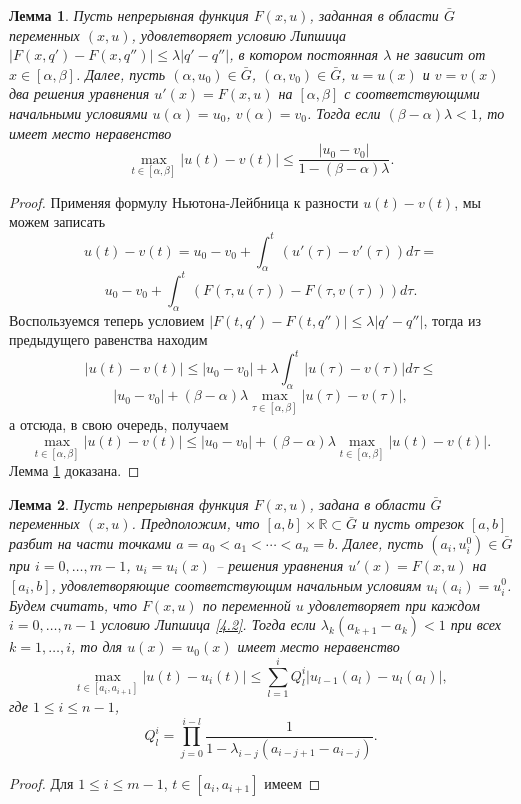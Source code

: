 \documentclass{article}
\numberwithin{equation}{section}
\theoremstyle{plain}
\newtheorem{lemma}{Лемма}[section]
\theoremstyle{definition}
\newtheorem{proof}{Доказательство}\def\theproof{}
\begin{document}
\begin{fulltext}
\begin{lemma}\label{lem4.1} Пусть непрерывная функция  $F(x,u)$, заданная в области $\bar  G$ переменных $(x,u)$, удовлетворяет условию Липшица $|F(x,q')-F(x,q'')|\le\lambda|q'-q''|$, в котором постоянная $\lambda$ не зависит от $x\in [\alpha,\beta]$.  Далее, пусть  $(\alpha,u_0)\in \bar G$, $(\alpha,v_0)\in \bar  G$, $u= u(x)$ и $v =v(x)$ два решения уравнения $u'(x)=F(x,u)$   на $[\alpha,\beta]$  с соответствующими начальными условиями  $u(\alpha)=u_0$,  $v(\alpha)=v_0$. Тогда если $(\beta-\alpha)\lambda<1$, то имеет место неравенство
$$
\max_{t\in[\alpha,\beta]}|u(t)-v(t)|\le \frac{|u_0-v_0|}{1-(\beta-\alpha)\lambda}.
$$
\end{lemma}
\begin{proof} Применяя формулу Ньютона-Лейбница к разности \linebreak $u(t)-v(t)$, мы можем  записать
$$
u(t)-v(t)=u_0-v_0+ \int_{\alpha}^t(u'(\tau)-v'(\tau))d\tau=
$$
$$
u_0-v_0+ \int_{\alpha}^t(F(\tau,u(\tau))-F(\tau,v(\tau)))d\tau.
$$
Воспользуемся теперь условием $|F(t,q')-F(t,q'')|\le\lambda|q'-q''|$, тогда из предыдущего равенства находим
$$
|u(t)-v(t)|\le|u_0-v_0|+\lambda\int_{\alpha}^t|u(\tau)-v(\tau)|d\tau\le
$$
$$
|u_0-v_0|+(\beta-\alpha) \lambda\max_{\tau\in[\alpha,\beta]}|u(\tau)-v(\tau)|,
$$
а отсюда, в свою очередь, получаем
$$
 \max_{t\in[\alpha,\beta]}|u(t)-v(t)|\le |u_0-v_0|+(\beta-\alpha)\lambda\max_{t\in[\alpha,\beta]}|u(t)-v(t)|.
$$
Лемма \ref{lem4.1} доказана.
\end{proof}
\begin{lemma}\label{lem4.2} Пусть непрерывная функция  $F(x,u)$, задана в области $\bar  G$ переменных $(x,u)$. Предположим, что $[a,b]\times\mathbb{R}\subset \bar G$ и пусть отрезок  $[a,b]$ разбит на части точками $a=a_0<a_1<\cdots<a_n=b$.   Далее, пусть  $(a_i,u_i^0)\in \bar G$ при $i=0,\ldots,m-1$, $u_i= u_i(x)$ -- решения уравнения $u'(x)=F(x,u)$   на $[a_i,b]$, удовлетворяющие соответствующим начальным условиям  $u_i(a_i)=u_i^0$. Будем считать, что $F(x,u)$ по переменной $u$  удовлетворяет при каждом $i=0,\ldots,n-1$ условию Липшица \eqref{4.2}.   Тогда если $\lambda_{k}(a_{k+1}-a_k)<1$ при всех $k=1,\ldots,i$, то для $u(x)=u_0(x)$ имеет место неравенство
$$
\max_{t\in[a_i,a_{i+1}]}|u(t)-u_i(t)|\le \sum_{l=1}^{i}Q_{l}^{i}|u_{l-1}(a_{l})-u_{l}(a_l)|,
$$
где $1\le i\le n-1$,
$$
Q_l^i=\prod_{j=0}^{i-l}\frac{1}{1-\lambda_{i-j}(a_{i-j+1}-a_{i-j})}.
$$
\end{lemma}
\begin{proof}
  Для $1\le i\le m-1$, $t\in[a_i,a_{i+1}]$ имеем

\end{proof}
\end{fulltext}
\end{document}
